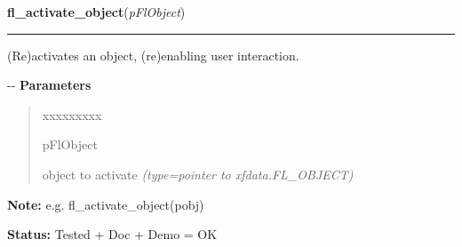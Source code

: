 \hspace{.8\funcindent}\begin{boxedminipage}{\funcwidth}

    \raggedright \textbf{fl\_activate\_object}(\textit{pFlObject})

    \vspace{-1.5ex}

    \rule{\textwidth}{0.5\fboxrule}
\setlength{\parskip}{2ex}

(Re)activates an object, (re)enabling user interaction.

-{}-
\setlength{\parskip}{1ex}
      \textbf{Parameters}
      \vspace{-1ex}

      \begin{quote}
        \begin{Ventry}{xxxxxxxxx}

          \item[pFlObject]


object to activate
            {\it (type=pointer to xfdata.FL\_OBJECT)}

        \end{Ventry}

      \end{quote}

\textbf{Note:} 
e.g. fl\_activate\_object(pobj)


\textbf{Status:} 
Tested + Doc + Demo = OK


    \end{boxedminipage}

    \label{xformslib:flbasic:fl_deactivate_object}

    \vspace{0.5ex}

